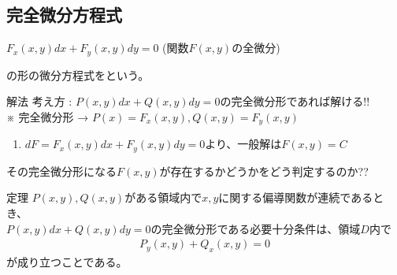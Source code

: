 \documentclass[a4paper]{jsarticle}
\begin{document}
\subsection{完全微分方程式}
\begin{center}
    $F_x\left(x,y\right)dx+F_y\left(x,y\right)dy=0$ (関数$F\left(x,y\right)$の全微分)
\end{center}
の形の微分方程式をという。
\begin{itembox}[l]{解法}
    考え方 : $P\left(x,y\right)dx+Q\left(x,y\right)dy=0$の完全微分形であれば解ける!!\\
    ※ 完全微分形 → $P\left(x\right)=F_x\left(x,y\right),Q\left(x,y\right)=F_y\left(x,y\right)$
    \begin{enumerate}[(1)]
        \item  $dF=F_x\left(x,y\right)dx+F_y\left(x,y\right)dy=0$より、一般解は$F\left(x,y\right)=C$
    \end{enumerate}
\end{itembox}
その完全微分形になる$F\left(x,y\right)$が存在するかどうかをどう判定するのか??
\begin{itembox}[l]{定理}
    $P\left(x,y\right),Q\left(x,y\right)$がある領域内で$x,y$に関する偏導関数が連続であるとき、\\
    $P\left(x,y\right)dx+Q\left(x,y\right)dy=0$の完全微分形である必要十分条件は、領域$D$内で
    \begin{eqnarray*}
        P_y\left(x,y\right)+Q_x\left(x,y\right)=0
    \end{eqnarray*}
    が成り立つことである。
\end{itembox}
\end{document}
